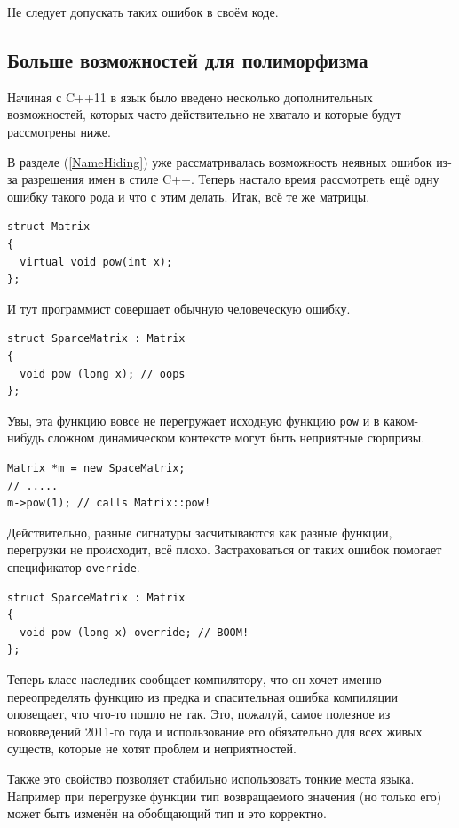 \documentclass[a4paper,12pt,oneside]{book}
\begin{document}
Не следует допускать таких ошибок в своём коде.

\subsection{Больше возможностей для полиморфизма}\label{NewVirtual}

Начиная с C++11 в язык было введено несколько дополнительных возможностей, которых часто действительно не хватало и которые будут рассмотрены ниже.

В разделе (\ref{NameHiding}) уже рассматривалась возможность неявных ошибок из-за разрешения имен в стиле C++. Теперь настало время рассмотреть ещё одну ошибку такого рода и что с этим делать. Итак, всё те же матрицы.

\begin{lstlisting}
struct Matrix
{
  virtual void pow(int x);
};
\end{lstlisting}

И тут программист совершает обычную человеческую ошибку.

\begin{lstlisting}
struct SparceMatrix : Matrix
{
  void pow (long x); // oops
};
\end{lstlisting}

Увы, эта функцию вовсе не перегружает исходную функцию \lstinline!pow! и в каком-нибудь сложном динамическом контексте могут быть неприятные сюрпризы. 

\begin{lstlisting}
Matrix *m = new SpaceMatrix;
// .....
m->pow(1); // calls Matrix::pow!
\end{lstlisting}

Действительно, разные сигнатуры засчитываются как разные функции, перегрузки не происходит, всё плохо. Застраховаться от таких ошибок помогает спецификатор \lstinline!override!.

\begin{lstlisting}
struct SparceMatrix : Matrix
{
  void pow (long x) override; // BOOM!
};
\end{lstlisting}

Теперь класс-наследник сообщает компилятору, что он хочет именно переопределять функцию из предка и спасительная ошибка компиляции оповещает, что что-то пошло не так. Это, пожалуй, самое полезное из нововведений 2011-го года и использование его обязательно для всех живых существ, которые не хотят проблем и неприятностей.

Также это свойство позволяет стабильно использовать тонкие места языка. Например при перегрузке функции тип возвращаемого значения (но только его) может быть изменён на обобщающий тип и это корректно.
\end{document}
